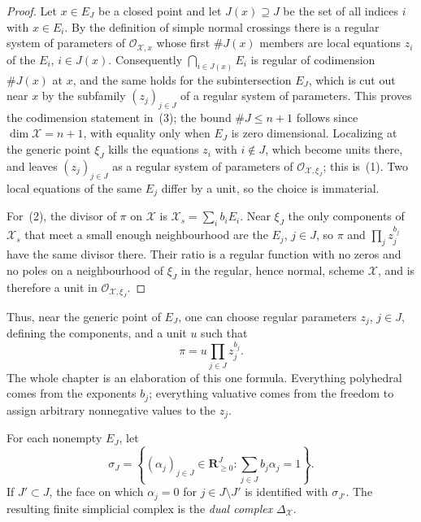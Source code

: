 \begin{proof}
Let $x\in E_J$ be a closed point and let $J(x)\supseteq J$ be the set of
all indices $i$ with $x\in E_i$. By the definition of simple normal
crossings there is a regular system of parameters of
$\mathcal O_{\mathcal X,x}$ whose first $\#J(x)$ members are local
equations $z_i$ of the $E_i$, $i\in J(x)$. Consequently
$\bigcap_{i\in J(x)}E_i$ is regular of codimension $\#J(x)$ at $x$,
and the same holds for the subintersection $E_J$, which is cut out near
$x$ by the subfamily $(z_j)_{j\in J}$ of a regular system of parameters.
This proves the codimension statement in
\,(3); the bound $\#J\le n+1$ follows since
$\dim\mathcal X=n+1$, with equality only when $E_J$ is zero
dimensional. Localizing at the generic point $\xi_J$ kills the equations
$z_i$ with $i\notin J$, which become units there, and leaves
$(z_j)_{j\in J}$ as a regular system of parameters of
$\mathcal O_{\mathcal X,\xi_J}$; this is
\,(1). Two local equations of the same $E_j$ differ
by a unit, so the choice is immaterial.

For \,(2), the divisor of $\pi$ on $\mathcal X$ is
$\mathcal X_s=\sum_ib_iE_i$. Near $\xi_J$ the only components of
$\mathcal X_s$ that meet a small enough neighbourhood are the $E_j$,
$j\in J$, so $\pi$ and $\prod_jz_j^{b_j}$ have the same divisor there.
Their ratio is a regular function with no zeros and no poles on a
neighbourhood of $\xi_J$ in the regular, hence normal, scheme
$\mathcal X$, and is therefore a unit in
$\mathcal O_{\mathcal X,\xi_J}$.
\end{proof}

Thus, near the generic point of $E_J$, one can choose regular parameters $z_j$,
$j\in J$, defining the components, and a unit $u$ such that
\[
                         \pi=u\prod_{j\in J}z_j^{b_j}.
\]
The whole chapter is an elaboration of this one formula. Everything
polyhedral comes from the exponents $b_j$; everything valuative comes from
the freedom to assign arbitrary nonnegative values to the $z_j$.

\begin{definition}
\label{def:skeleton-dual-complex}
For each nonempty $E_J$, let
\[
 \sigma_J=
 \left\{(\alpha_j)_{j\in J}\in\mathbf R_{\geq0}^{J}:
                         \sum_{j\in J}b_j\alpha_j=1\right\}.
\]
If $J'\subset J$, the face on which $\alpha_j=0$ for
$j\in J\setminus J'$ is identified with $\sigma_{J'}$. The resulting
finite simplicial complex is the \emph{dual complex}
$\Delta_{\mathcal X}$.
\end{definition}

